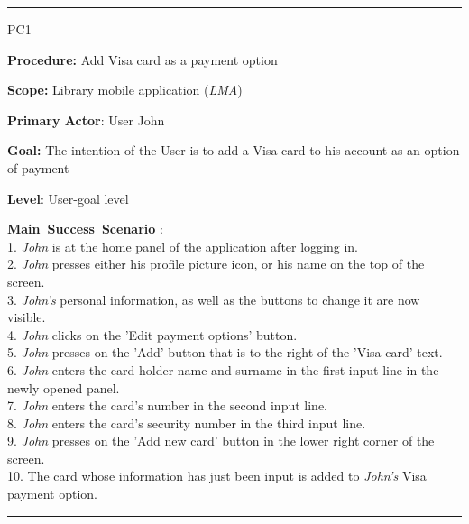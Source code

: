 \vspace{0.5cm}
\hrule
\begin{lyxlist}{PC1}
\small{
\item [\textbf{Procedure:}] Add Visa card as a payment option
\item [\textbf{Scope:}] Library mobile application (\emph{LMA})
\item [\textbf{Primary Actor}:] User John
\item [\textbf{Goal:}] The intention of the User is to add a Visa card to his
account as an option of payment
\item [\textbf{Level}:] User-goal level
\item [\textbf{Main~Success~Scenario}]:\\
1. \emph{John} is at the home panel of the application after logging in.\\
2. \emph{John} presses either his profile picture icon, or his name on the
top of the screen.\\
3. \emph{John's} personal information, as well as the buttons to change it are
now visible.\\
4. \emph{John} clicks on the 'Edit payment options' button.\\
5. \emph{John} presses on the 'Add' button that is to the right of the 'Visa
card' text.\\
6. \emph{John} enters the card holder name and surname in the first input line
in the newly opened panel. \\
7. \emph{John} enters the card's number in the second input line. \\
8. \emph{John} enters the card's security number in the third input line. \\
9. \emph{John} presses on the 'Add new card' button in the lower right corner
of the screen. \\
10. The card whose information has just been input is added to
\emph{John's} Visa payment option. \\

}

\end{lyxlist}
\hrule


